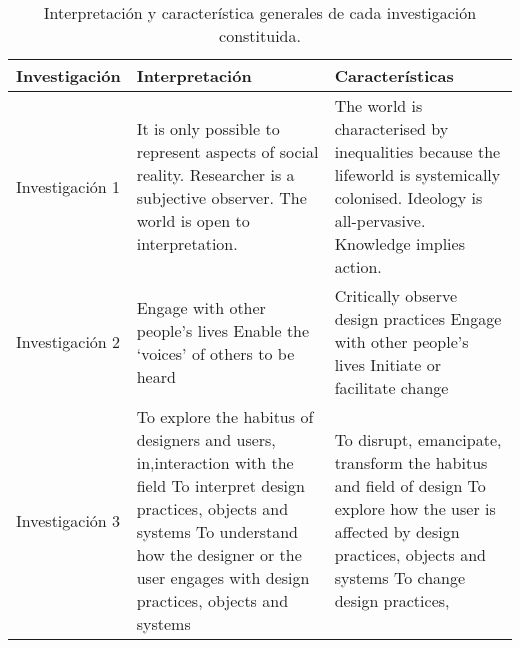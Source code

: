 \fontsize{14}{15}\selectfont
\blindtext
\begin{table}[h]
    \begin{tabular}{  l  p{3cm}  p{7.7cm} } %
        \toprule
\textbf{Investigación}      
& \textbf{Interpretación}   
& \textbf{Características} \\\midrule
Investigación 1
& It is only possible to represent aspects of social reality. Researcher is a subjective observer. The world is open to interpretation.        
& The world is characterised by inequalities because the lifeworld is systemically colonised. Ideology is all-pervasive. Knowledge implies action. \\\hline
Investigación 2       
& Engage with other people’s lives Enable the ‘voices’ of others to be heard                         
& Critically observe design practices Engage with other people’s lives Initiate or facilitate change  \\\hline
Investigación 3        
& To explore the habitus of designers and users, in,interaction with the field To interpret design practices, objects and systems To understand how the designer or the user engages with design practices, objects and systems 
& To disrupt, emancipate, transform the habitus and field of design To explore how the user is affected by design practices, objects and systems To change design practices, \\
    \bottomrule
    \end{tabular}
    \captionsetup{labelsep=period, labelfont=bf}
    \caption{Interpretación y característica generales de cada investigación constituida.}
     \label{table1}
\end{table}
